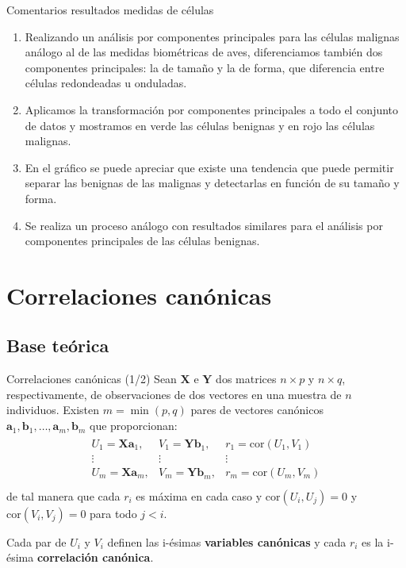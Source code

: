 \documentclass{beamer}
\begin{document}
\begin{frame}{Comentarios resultados medidas de células}
\begin{footnotesize}
\begin{enumerate}
\color{red}
    \item Realizando un análisis por componentes principales para las células malignas análogo al de las medidas biométricas de aves, diferenciamos también dos componentes principales: la de tamaño y la de forma, que diferencia entre células redondeadas u onduladas.
    \item Aplicamos la transformación por componentes principales a todo el conjunto de datos y mostramos en verde las células benignas y en rojo las células malignas.
    \item En el gráfico se puede apreciar que existe una tendencia que puede permitir separar las benignas de las malignas y detectarlas en función de su tamaño y forma.
    \item Se realiza un proceso análogo con resultados similares para el análisis por componentes principales de las células benignas.
\end{enumerate}
\end{footnotesize}
    
\end{frame}


\section{Correlaciones canónicas}
\subsection{Base teórica}
\begin{frame}{Correlaciones canónicas (1/2)}
Sean $\mathbf{X}$ e $\mathbf{Y}$ dos matrices $n  \times p$ y $n \times q$, respectivamente, de observaciones de dos vectores en una muestra de $n$ individuos. Existen $m = \min (p,q)$ pares de vectores canónicos $\mathbf{a}_1, \mathbf{b}_1, \ldots, \mathbf{a}_m, \mathbf{b}_m$ que proporcionan:
\begin{align*}
\begin{array}{ccc}
    U_1 = \mathbf{Xa}_1, & V_1 = \mathbf{Yb}_1, & r_1 = \mbox{cor}(U_1,V_1)\\
    \vdots & \vdots & \vdots\\
    U_m = \mathbf{Xa}_m, & V_m = \mathbf{Yb}_m, & r_m = \mbox{cor}(U_m,V_m)\\
\end{array}
\end{align*}
de tal manera que cada $r_i$ es máxima en cada caso y $\mbox{cor}(U_i, U_j)=0$ y $\mbox{cor}(V_i, V_j)=0$ para todo $j<i$. 

Cada par de $U_i$ y $V_i$ definen las i-ésimas \textbf{variables canónicas} y cada $r_i$ es la i-ésima \textbf{correlación canónica}.
\end{frame}
\end{document}
